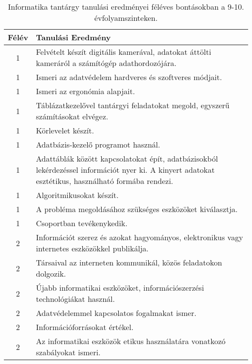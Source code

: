        
           \begin{longtable}{c | p{} }
            \caption[Informatika 9-10.]{Informatika tantárgy tanulási eredményei féléves bontásokban a 9-10. évfolyamszinteken. }  \\

            \textbf{Félév} & \textbf{Tanulási Eredmény} \\
            \hline
            \endhead
                                
                                          1 &  Felvételt készít digitális kamerával, adatokat áttölti kameráról a számítógép adathordozójára. \\ \hline
                                          1 &  Ismeri az adatvédelem hardveres és szoftveres módjait. \\ \hline
                                          1 &  Ismeri az ergonómia alapjait. \\ \hline
                                          1 &  Táblázatkezelővel tantárgyi feladatokat megold, egyszerű számításokat elvégez. \\ \hline
                                          1 &  Körlevelet készít. \\ \hline
                                          1 &  Adatbázis-kezelő programot használ. \\ \hline
                                          1 &  Adattáblák között kapcsolatokat épít, adatbázisokból lekérdezéssel információt nyer ki. A kinyert adatokat esztétikus, használható formába rendezi. \\ \hline
                                          1 &  Algoritmikusokat készít. \\ \hline
                                          1 &  A probléma megoldásához szükséges eszközöket kiválasztja. \\ \hline
                                          1 &  Csoportban tevékenykedik. \\ \hline
                                      
                                
                                          2 &  Információt szerez és azokat hagyományos, elektronikus vagy internetes eszközökkel publikálja. \\ \hline
                                          2 &  Társaival az interneten kommunikál, közös feladatokon dolgozik. \\ \hline
                                          2 &  Újabb informatikai eszközöket, információszerzési technológiákat használ. \\ \hline
                                          2 &  Adatvédelemmel kapcsolatos fogalmakat ismer. \\ \hline
                                          2 &  Információforrásokat értékel. \\ \hline
                                          2 &  Az informatikai eszközök etikus használatára vonatkozó szabályokat ismeri. \\ \hline
                                      

\end{longtable}
